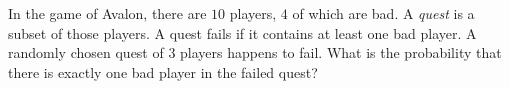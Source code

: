 In the game of Avalon, there are $10$ players, $4$ of which are bad. A \emph{quest} is a subset of those players. A quest fails if it contains at least one bad player. A randomly chosen quest of $3$ players happens to fail. What is the probability that there is exactly one bad player in the failed quest?